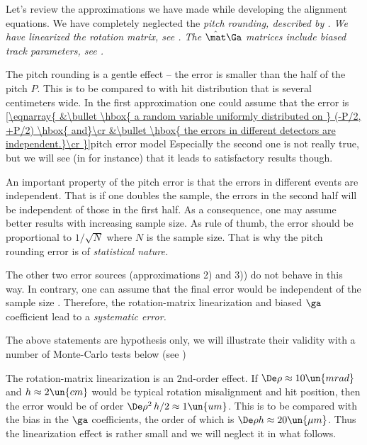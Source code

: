 Let's review the approximations we have made while developing the alignment equations.
\bitm
\itm We have completely neglected the \em{pitch rounding}, described by .
\itm We have \em{linearized the rotation matrix}, see .
\itm The $\hat\mat\Ga$ matrices include \em{biased track parameters}, see .
\eitm

The pitch rounding is a gentle effect -- the error is smaller than the half of the pitch $P$. This is to be compared to with hit distribution that is several centimeters wide. In the first approximation one could assume that the error is
\eqref{\eqnarray{
&\bullet \hbox{ a random variable uniformly distributed on } (-P/2, +P/2) \hbox{ and}\cr
&\bullet \hbox{ the errors in different detectors are independent.}\cr
}}{pitch error model}
Especially the second one is not really true, but we will see (in  for instance) that it leads to satisfactory results though.

An important property of the pitch error is that the errors in different events are independent. That is
if one doubles the sample, the errors in the second half will be independent of those in the first half. As a consequence, one may assume better results with increasing sample size. As rule of thumb, the error should be proportional to $1/\sqrt N$ where $N$ is the sample size. That is why the pitch rounding error is of \em{statistical} nature.

The other two error sources (approximations 2) and 3)) do not behave in this way. In contrary, one can assume that the final error would be independent of the sample size
. Therefore, the rotation-matrix linearization and biased $\ga$ coefficient lead to a \em{systematic} error.

The above statements are hypothesis only, we will illustrate their validity with a number of Monte-Carlo tests below (see )

The rotation-matrix linearization is an 2nd-order effect. If $\De\rho\approx 10\un{mrad}$ and $h\approx 2\un{cm}$ would be typical rotation misalignment and hit position, then the error would be of order $\De\rho^2\,h/2\approx 1\un{um}$. This is to be compared with the bias in the $\ga$ coefficients, the order of which is $\De\rho h \approx 20\un{\mu m}$. Thus the linearization effect is rather small and we will neglect it in what follows.


